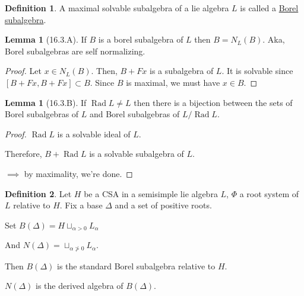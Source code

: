 \documentclass{article}
\theoremstyle{definition}
\newtheorem*{definition}{Definition}
\newtheorem{lemma}[theorem]{Lemma}
\begin{document}
    \begin{definition}
        A maximal solvable subalgebra of a lie algebra \(L\) is called a \underline{Borel} \underline{subalgebra}.
    \end{definition}

    \begin{lemma}
        [16.3.A] If \(B\) is a borel subalgebra of \(L\) then \(B = N_L(B)\). Aka, Borel subalgebras are self normalizing.
    \end{lemma}

    \begin{proof}
        Let \(x\in N_L(B)\). Then, \(B + Fx\) is a subalgebra of \(L\). It is solvable since \([B+Fx,B+Fx] \subset B\). Since \(B\) is maximal, we must have \(x\in B\).
    \end{proof}

    \begin{lemma}
        [16.3.B] If \(\operatorname{Rad} L \neq L\) then there is a bijection between the sets of Borel subalgebras of \(L\) and Borel subalgebras of \(L / \operatorname{Rad} L\).
    \end{lemma}

    \begin{proof}
        \(\operatorname{Rad} L\) is a solvable ideal of \(L\).

        Therefore, \(B + \operatorname{Rad} L\) is a solvable subalgebra of \(L\).

        \(\implies\) by maximality, we're done.
    \end{proof}

    \begin{definition}
        Let \(H\) be a CSA in a semisimple lie algebra \(L\), \(\Phi\) a root system of \(L\) relative to \(H\). Fix a base \(\Delta\) and a set of positive roots.

        Set \(B(\Delta) = H \sqcup_{\alpha > 0} L_\alpha\)

        And \(N(\Delta) = \sqcup_{\alpha \not> 0} L_\alpha\).

        Then \(B(\Delta)\) is the standard Borel subalgebra relative to \(H\).

        \(N(\Delta)\) is the derived algebra of \(B(\Delta)\).
    \end{definition}
\end{document}
